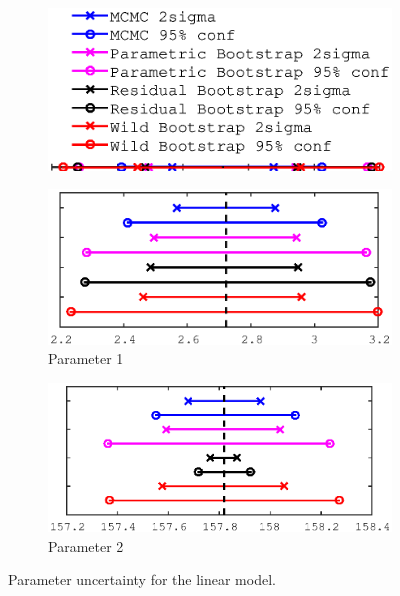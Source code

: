 \documentclass[11pt,a4paper,oneside]{report}
\begin{document}
\begin{figure}
   \centering
    \begin{subfigure}[b]{0.4\textwidth}
    \includegraphics[width=\textwidth, trim=0 15 0 0,clip=true]{figures/task5/uncert_legend.eps}
  \end{subfigure}%

  \begin{subfigure}[b]{0.5\textwidth}
    \includegraphics[width=\textwidth, trim=0 0 0 0,clip=true]{figures/task5/uncert_model1_param1.eps}
    \caption{Parameter 1}
  \end{subfigure}%
  \begin{subfigure}[b]{0.5\textwidth}
    \includegraphics[width=\textwidth, trim=0 0 0 0,clip=true]{figures/task5/uncert_model1_param2.eps}
    \caption{Parameter 2}
  \end{subfigure}%
  
  \caption{Parameter uncertainty for the linear model.}
  \label{fig:c5uncertM1}
  
\end{figure}
\end{document}
